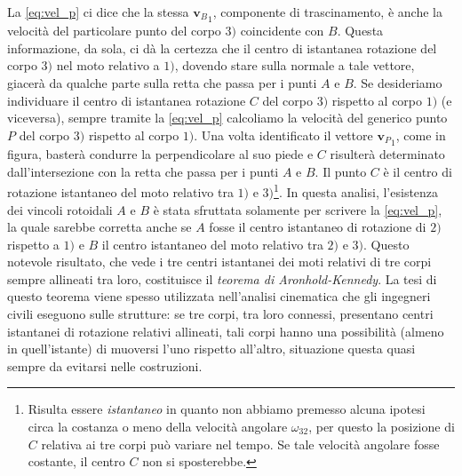 \noindent La \ref{eq:vel_p} ci dice che la stessa 
${{\bm v}_B}_1$, componente di trascinamento, \`e anche la velocit\`a del
particolare punto del corpo $3)$ coincidente con $B$.
Questa informazione, da sola, ci d\`a la certezza che il centro di istantanea
rotazione del corpo $3)$ nel moto relativo a $1)$, dovendo stare
sulla normale a tale vettore,
giacer\`a da
qualche parte sulla retta che passa per i punti $A$ e $B$.
Se desideriamo individuare il centro di istantanea rotazione $C$ del
corpo $3)$ rispetto al corpo $1)$ (e viceversa),
sempre tramite la \ref{eq:vel_p} calcoliamo la velocit\`a
del generico punto $P$ del corpo $3)$ rispetto al corpo $1)$.
Una volta identificato il vettore
${{\bm v}_{\scriptscriptstyle P}}_{\scriptscriptstyle 1}$, 
come in figura, baster\`a condurre la perpendicolare al suo piede e
$C$ risulter\`a determinato dall'intersezione con
la retta che passa per i punti $A$ e $B$.
Il punto $C$ \`e il centro di rotazione istantaneo
del moto relativo tra $1)$ e $3)$\footnote{Risulta essere 
{\em istantaneo} in quanto non abbiamo premesso alcuna ipotesi circa la
costanza o meno della velocit\`a angolare 
$\omega_{32}$, per questo la posizione di $C$
relativa ai tre corpi pu\`o variare nel tempo. Se tale velocit\`a angolare fosse costante,
il centro $C$ non si sposterebbe.}.
In questa analisi,
l'esistenza dei vincoli rotoidali $A$ e $B$
\`e stata sfruttata solamente per scrivere 
la \ref{eq:vel_p}, la quale sarebbe corretta anche se $A$
fosse il centro istantaneo di rotazione di $2)$ 
rispetto a $1)$ e $B$ il centro istantaneo del moto relativo tra $2)$ e $3)$.
Questo notevole risultato, che vede i tre centri istantanei dei moti relativi di
tre corpi sempre allineati tra loro, costituisce il {\em teorema di
Aronhold-Kennedy}. 
La tesi di questo teorema viene spesso utilizzata nell'analisi cinematica
che gli ingegneri civili eseguono sulle strutture:
se tre corpi, tra loro connessi,
 presentano centri istantanei di rotazione relativi allineati,
tali corpi hanno una possibilit\`a (almeno in quell'istante) di muoversi
l'uno rispetto all'altro, situazione questa quasi sempre da evitarsi
nelle costruzioni.
\newpage
\thispagestyle{empty}
\null

\endinput
